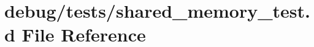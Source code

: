 \hypertarget{shared__memory__test_8d}{
\section{debug/tests/shared\_\-memory\_\-test.d File Reference}
\label{shared__memory__test_8d}
}

